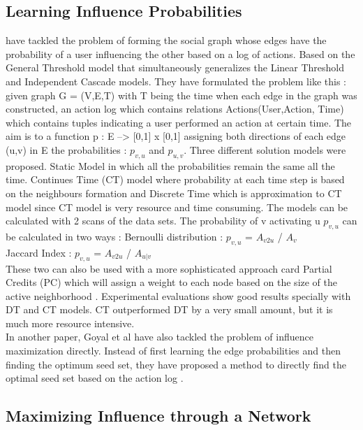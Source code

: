 \documentclass[english]{tktltiki}
\begin{document}
\subsection{Learning Influence Probabilities}
\cite{goyal10} have tackled the problem of forming the social graph whose edges have the probability of a user
influencing the other based on a log of actions. Based on the General Threshold model that simultaneously 
generalizes the Linear Threshold and Independent Cascade models. They have formulated the problem like this :
given graph G = (V,E,T) with T being the time when each edge in the graph was constructed, an action log which contains relations Actions(User,Action, Time) which contains tuples indicating a user performed an action at certain time. The aim is to a function p : E --> [0,1] x [0,1] assigning both directions of each edge (u,v) in E the probabilities : $p_{v,u}$ and $p_{u,v}$.
Three different solution models were proposed. Static Model in which all the probabilities remain the same all the time. Continues Time (CT) model where probability at each time step is based on the neighbours formation and Discrete Time which is approximation to CT model since CT model is very resource and time consuming. 
The models can be calculated with 2 scans of the data sets. The probability of v activating u $p_{v,u}$ can be calculated in two ways : 
Bernoulli distribution :  $p_{v,u}$ =  $A_{v2u}$ / ${A_v}$ \\
Jaccard Index : $p_{v,u}$ =  $A_{v2u}$ / $A_{u|v}$ \\ 
These two can also be used with a more sophisticated approach card Partial Credits (PC) which will assign a 
weight to each node based on the size of the active neighborhood . Experimental evaluations show good results 
specially with DT and CT models. CT outperformed DT by a very small amount, but it is much more resource intensive. \\
In another paper, Goyal et al \cite{goyal11} have also tackled the problem of influence maximization directly. Instead of first learning the edge probabilities and then finding the optimum seed set, they have proposed a method to directly find the optimal seed set based on the action log .

\subsection{Maximizing Influence through a Network}
\end{document}
